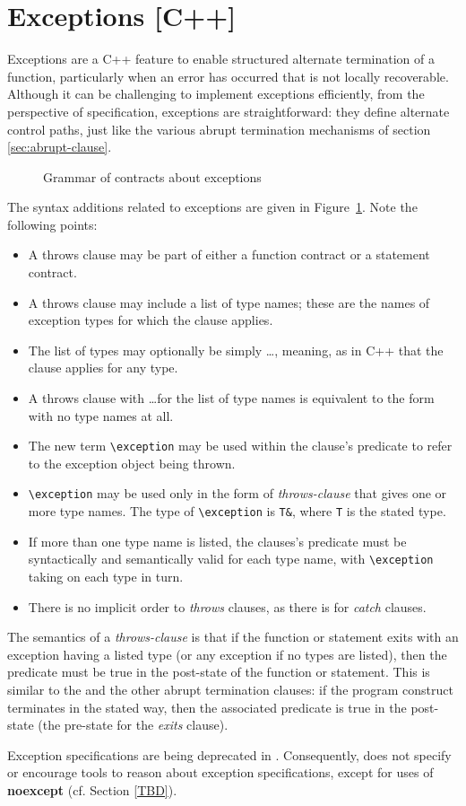\section{Exceptions [C++]}
\label{sec:exceptions}

Exceptions are a C++ feature to enable structured alternate termination of a function, particularly when an error has occurred that is not locally recoverable. Although it can be challenging to implement exceptions efficiently, from the perspective of specification, exceptions are straightforward: they define alternate control paths, just like the various abrupt termination mechanisms of section \ref{sec:abrupt-clause}.

\begin{figure}[t]
	\begin{cadre}
		
	\end{cadre}
	\caption{Grammar of contracts about exceptions}
	\label{fig:gram:throws-clause}
\end{figure}


The syntax additions related to exceptions are given in 
Figure~\ref{fig:gram:throws-clause}. Note the following points:
\begin{itemize}
\item A throws clause may be part of either a function contract or a statement contract.
\item A throws clause may include a list of type names; these are the names of exception types for which the
clause applies.
\item The list of types may optionally be simply \ldots, meaning, as in C++ that the clause applies for any type.
\item A throws clause with \ldots for the list of type names is equivalent to the form with no type names at all.
\item The new term \lstinline|\exception| may be used within the clause's predicate to refer to the exception object being thrown. 
\item \lstinline|\exception| may be used only in the form of \textsl{throws-clause} that gives one or more type names. The type of \lstinline|\exception| is \lstinline|T&|, where \lstinline|T| is the stated type.
\item If more than one type name is listed, the clauses's predicate must be syntactically and semantically valid for each type name, with \lstinline|\exception| taking on each type in turn.
\item There is no implicit order to \textsl{throws} clauses, as there is for \textsl{catch} clauses.
\end{itemize}
The semantics of a \textsl{throws-clause} is that if the function or statement exits with an exception having a listed type (or any exception if no types are listed), then the predicate must be true in the post-state of the function or statement. This is similar to the \ensures and the other abrupt termination clauses: if the program construct terminates in the stated way, then the associated predicate is true in the post-state (the pre-state for the \textsl{exits} clause).

Exception specifications are being deprecated in \lang. Consequently, \NAME{} does not specify or encourage tools to reason about \lang{} exception specifications, except for  uses of \textbf{noexcept} (cf. Section \ref{TBD}).

